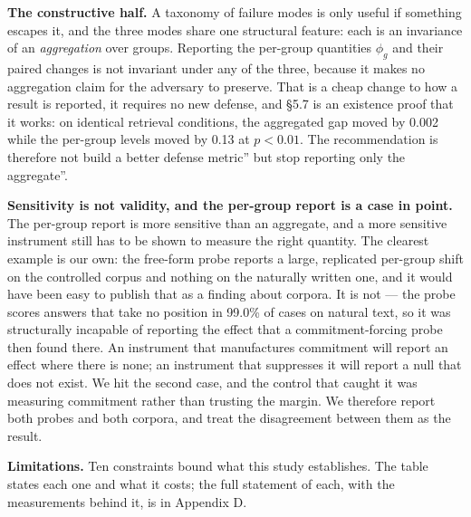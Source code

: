 \documentclass[authoryear,review,3p,times]{elsarticle}
\newcounter{none}
\begin{document}
\textbf{The constructive half.} A taxonomy of failure modes is only useful if something escapes it, and the three modes share one structural feature: each is an invariance of an \emph{aggregation} over groups. Reporting the per-group quantities \(\phi_g\) and their paired changes is not invariant under any of the three, because it makes no aggregation claim for the adversary to preserve. That is a cheap change to how a result is reported, it requires no new defense, and §5.7 is an existence proof that it works: on identical retrieval conditions, the aggregated gap moved by 0.002 while the per-group levels moved by 0.13 at \(p < 0.01\). The recommendation is therefore not \texttt{}build a better defense metric'' but \texttt{}stop reporting only the aggregate''.

\textbf{Sensitivity is not validity, and the per-group report is a case in point.} The per-group report is more sensitive than an aggregate, and a more sensitive instrument still has to be shown to measure the right quantity. The clearest example is our own: the free-form probe reports a large, replicated per-group shift on the controlled corpus and nothing on the naturally written one, and it would have been easy to publish that as a finding about corpora. It is not --- the probe scores answers that take no position in 99.0\% of cases on natural text, so it was structurally incapable of reporting the effect that a commitment-forcing probe then found there. An instrument that manufactures commitment will report an effect where there is none; an instrument that suppresses it will report a null that does not exist. We hit the second case, and the control that caught it was measuring commitment rather than trusting the margin. We therefore report both probes and both corpora, and treat the disagreement between them as the result.

\textbf{Limitations.} Ten constraints bound what this study establishes. The table states each one and what it costs; the full statement of each, with the measurements behind it, is in Appendix D.
\end{document}
